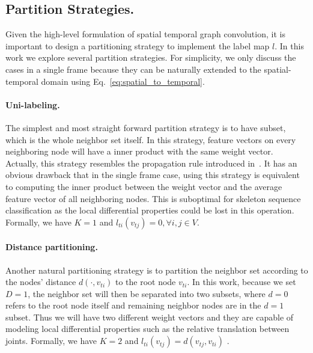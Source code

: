 \documentclass[letterpaper]{article} %
\begin{document}
\subsection{Partition Strategies.}\label{sec:partition}
Given the high-level formulation of spatial temporal graph convolution, it is important to design a partitioning strategy to implement the label map $ l $.
In this work we explore several partition strategies.
For simplicity, we only discuss the cases in a single frame because they can be naturally extended to the spatial-temporal domain using Eq.~\ref{eq:spatial_to_temporal}.

\paragraph{Uni-labeling.}
The simplest and most straight forward partition strategy is to have subset, which is the whole neighbor set itself.
In this strategy, feature vectors on every neighboring node will have a inner product with the same weight vector.
Actually, this strategy resembles the propagation rule introduced in~\cite{Kipf2017ICLR}.
It has an obvious drawback that in the single frame case, using this strategy is equivalent to computing the inner product between the weight vector and the average feature vector of all neighboring nodes.
This is suboptimal for skeleton sequence classification as the local differential properties could be lost in this operation.
Formally, we have $K=1$ and $l_{ti}(v_{tj}) = 0, \forall i,j \in V$.

\paragraph{Distance partitioning.}
Another natural partitioning strategy is to partition the neighbor set according to the nodes' distance $ d(\cdot, v_{ti}) $ to the root node $ v_{ti} $.
In this work, because we set $ D = 1 $, the neighbor set will then be separated into two subsets, where $ d = 0 $ refers to the root node itself and remaining neighbor nodes are in the $d=1$ subset.
Thus we will have two different weight vectors and they are capable of modeling local differential properties such as the relative translation between joints. Formally, we have $K=2$ and
$l_{ti}(v_{tj}) = d(v_{tj}, v_{ti})$ .
\end{document}
